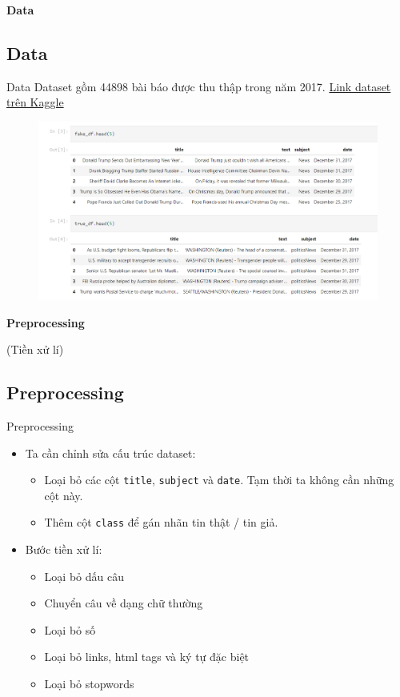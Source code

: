 \documentclass[aspectratio=169,xcolor=dvipsnames]{beamer}
\begin{document}
\begin{frame}
	\Huge{\centerline{\textbf{Data}}}
\end{frame}

\subsection{Data}
\begin{frame}{Data}
Dataset gồm 44898 bài báo được thu thập trong năm 2017. \href{https://www.kaggle.com/datasets/clmentbisaillon/fake-and-real-news-dataset}{Link dataset trên Kaggle}
\begin{figure}
\includegraphics[width=0.8\linewidth]{img/quick-glance-at-data.PNG}
\end{figure}
\end{frame}


\begin{frame}
	\Huge{\centerline{\textbf{Preprocessing}}}
	\centerline{(Tiền xử lí)}
\end{frame}

\subsection{Preprocessing}
\begin{frame}{Preprocessing}
\begin{itemize}
\item Ta cần chỉnh sửa cấu trúc dataset:
\begin{itemize}
\item Loại bỏ các cột \texttt{title}, \texttt{subject} và \texttt{date}. Tạm thời ta không cần những cột này.
\item Thêm cột \texttt{class} để gán nhãn tin thật / tin giả.
\end{itemize}
\item Bước tiền xử lí:
\begin{itemize}
\item Loại bỏ dấu câu
\item Chuyển câu về dạng chữ thường
\item Loại bỏ số
\item Loại bỏ links, html tags và ký tự đặc biệt
\item Loại bỏ stopwords
\end{itemize}
\end{itemize}
\end{frame}
\end{document}
